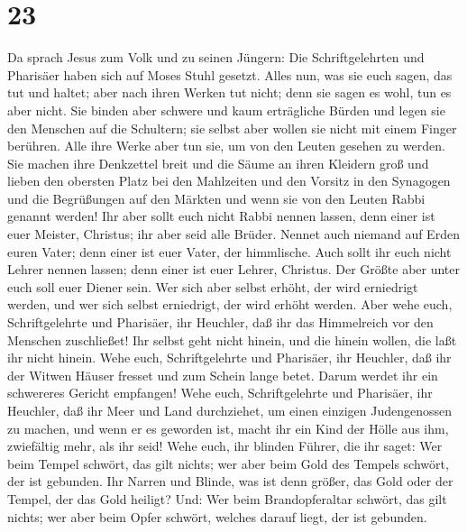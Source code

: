 \hypertarget{section-22}{%
\section{23}\label{section-22}}

 Da sprach Jesus zum Volk und zu seinen Jüngern:
 Die Schriftgelehrten und Pharisäer haben sich auf Moses
Stuhl gesetzt.  Alles nun, was sie euch sagen, das tut und
haltet; aber nach ihren Werken tut nicht; denn sie sagen es wohl, tun es
aber nicht.  Sie binden aber schwere und kaum erträgliche
Bürden und legen sie den Menschen auf die Schultern; sie selbst aber
wollen sie nicht mit einem Finger berühren.  Alle ihre
Werke aber tun sie, um von den Leuten gesehen zu werden. Sie machen ihre
Denkzettel breit und die Säume an ihren Kleidern groß  und
lieben den obersten Platz bei den Mahlzeiten und den Vorsitz in den
Synagogen  und die Begrüßungen auf den Märkten und wenn
sie von den Leuten Rabbi genannt werden!  Ihr aber sollt
euch nicht Rabbi nennen lassen, denn einer ist euer Meister, Christus;
ihr aber seid alle Brüder.  Nennet auch niemand auf Erden
euren Vater; denn einer ist euer Vater, der himmlische. 
Auch sollt ihr euch nicht Lehrer nennen lassen; denn einer ist euer
Lehrer, Christus.  Der Größte aber unter euch soll euer
Diener sein.  Wer sich aber selbst erhöht, der wird
erniedrigt werden, und wer sich selbst erniedrigt, der wird erhöht
werden.  Aber wehe euch, Schriftgelehrte und Pharisäer,
ihr Heuchler, daß ihr das Himmelreich vor den Menschen zuschließet! Ihr
selbst geht nicht hinein, und die hinein wollen, die laßt ihr nicht
hinein.  Wehe euch, Schriftgelehrte und Pharisäer, ihr
Heuchler, daß ihr der Witwen Häuser fresset und zum Schein lange betet.
Darum werdet ihr ein schwereres Gericht empfangen!  Wehe
euch, Schriftgelehrte und Pharisäer, ihr Heuchler, daß ihr Meer und Land
durchziehet, um einen einzigen Judengenossen zu machen, und wenn er es
geworden ist, macht ihr ein Kind der Hölle aus ihm, zwiefältig mehr, als
ihr seid!  Wehe euch, ihr blinden Führer, die ihr saget:
Wer beim Tempel schwört, das gilt nichts; wer aber beim Gold des Tempels
schwört, der ist gebunden.  Ihr Narren und Blinde, was
ist denn größer, das Gold oder der Tempel, der das Gold heiligt?
 Und: Wer beim Brandopferaltar schwört, das gilt nichts;
wer aber beim Opfer schwört, welches darauf liegt, der ist gebunden.
